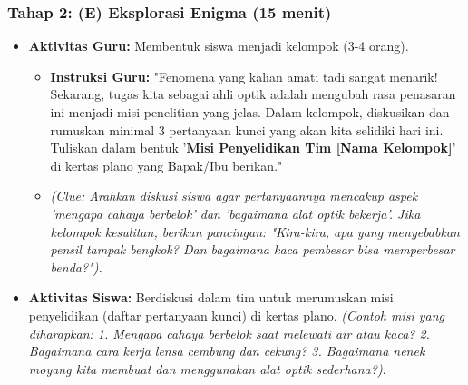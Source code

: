 \documentclass[12pt,a4paper]{article}
\begin{document}
\subsubsection{Tahap 2: (E) Eksplorasi Enigma (15 menit)}
\begin{itemize}
\item \textbf{Aktivitas Guru:} Membentuk siswa menjadi kelompok (3-4 orang).
    \begin{itemize}
    \item \textbf{Instruksi Guru:} "Fenomena yang kalian amati tadi sangat menarik! Sekarang, tugas kita sebagai ahli optik adalah mengubah rasa penasaran ini menjadi misi penelitian yang jelas. Dalam kelompok, diskusikan dan rumuskan minimal 3 pertanyaan kunci yang akan kita selidiki hari ini. Tuliskan dalam bentuk '\textbf{Misi Penyelidikan Tim [Nama Kelompok]}' di kertas plano yang Bapak/Ibu berikan."
    \item \textit{(Clue: Arahkan diskusi siswa agar pertanyaannya mencakup aspek 'mengapa cahaya berbelok' dan 'bagaimana alat optik bekerja'. Jika kelompok kesulitan, berikan pancingan: "Kira-kira, apa yang menyebabkan pensil tampak bengkok? Dan bagaimana kaca pembesar bisa memperbesar benda?").}
    \end{itemize}
\item \textbf{Aktivitas Siswa:} Berdiskusi dalam tim untuk merumuskan misi penyelidikan (daftar pertanyaan kunci) di kertas plano. \textit{(Contoh misi yang diharapkan: 1. Mengapa cahaya berbelok saat melewati air atau kaca? 2. Bagaimana cara kerja lensa cembung dan cekung? 3. Bagaimana nenek moyang kita membuat dan menggunakan alat optik sederhana?)}.
\end{itemize}
\end{document}
